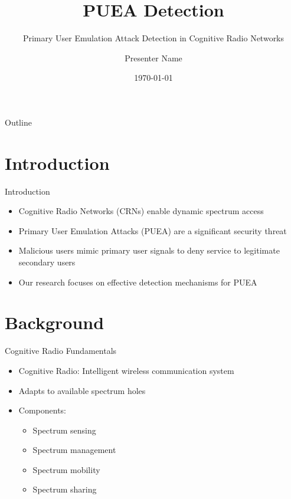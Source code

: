 \documentclass{beamer}
\title{PUEA Detection}
\subtitle{Primary User Emulation Attack Detection in Cognitive Radio Networks}
\author{Presenter Name}
\date{\today}
\begin{document}
\begin{frame}
    \titlepage
\end{frame}

\begin{frame}{Outline}
    \tableofcontents
\end{frame}

\section{Introduction}
\begin{frame}{Introduction}
    \begin{itemize}
        \item Cognitive Radio Networks (CRNs) enable dynamic spectrum access
        \item Primary User Emulation Attacks (PUEA) are a significant security threat
        \item Malicious users mimic primary user signals to deny service to legitimate secondary users
        \item Our research focuses on effective detection mechanisms for PUEA
    \end{itemize}
\end{frame}

\section{Background}
\begin{frame}{Cognitive Radio Fundamentals}
    \begin{itemize}
        \item Cognitive Radio: Intelligent wireless communication system
        \item Adapts to available spectrum holes
        \item Components:
        \begin{itemize}
            \item Spectrum sensing
            \item Spectrum management
            \item Spectrum mobility
            \item Spectrum sharing
        \end{itemize}
    \end{itemize}
\end{frame}
\end{document}

